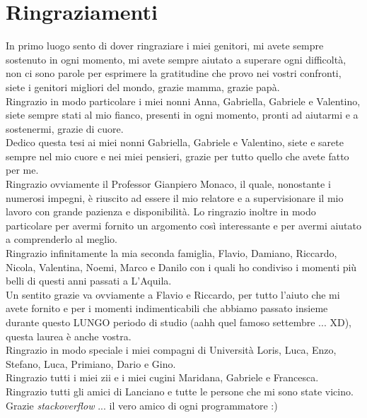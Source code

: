 \chapter*{Ringraziamenti}
\justify
In primo luogo sento di dover ringraziare i miei genitori, mi avete sempre sostenuto in ogni momento, mi avete sempre aiutato a superare ogni difficoltà, non ci sono parole per esprimere la gratitudine che provo nei vostri confronti, siete i genitori migliori del mondo, grazie mamma, grazie papà.\\
Ringrazio in modo particolare i miei nonni Anna, Gabriella, Gabriele e Valentino, siete sempre stati al mio fianco, presenti in ogni momento, pronti ad aiutarmi e a sostenermi, grazie di cuore.\\
Dedico questa tesi ai miei nonni Gabriella, Gabriele e Valentino, siete e sarete sempre nel mio cuore e nei miei pensieri, grazie per tutto quello che avete fatto per me.\\
Ringrazio ovviamente il Professor Gianpiero Monaco, il quale, nonostante i numerosi impegni, è riuscito ad essere il mio relatore e a supervisionare il mio lavoro con grande pazienza e disponibilità. Lo ringrazio inoltre in modo particolare per avermi fornito un argomento così interessante e per avermi aiutato a comprenderlo al meglio.\\
Ringrazio infinitamente la mia seconda famiglia, Flavio, Damiano, Riccardo, Nicola, Valentina, Noemi, Marco e Danilo con i quali ho condiviso i momenti più belli di questi anni passati a L'Aquila.\\
Un sentito grazie va ovviamente a Flavio e Riccardo, per tutto l'aiuto che mi avete fornito e per i momenti indimenticabili che abbiamo passato insieme durante questo LUNGO periodo di studio (aahh quel famoso settembre ... XD), questa laurea è anche vostra.\\
Ringrazio in modo speciale i miei compagni di Università Loris, Luca, Enzo, Stefano, Luca, Primiano, Dario e Gino.\\
Ringrazio tutti i miei zii e i miei cugini Maridana, Gabriele e Francesca.\\
Ringrazio tutti gli amici di Lanciano e tutte le persone che mi sono state vicino.\\
Grazie \textit{stackoverflow} ... il vero amico di ogni programmatore :)